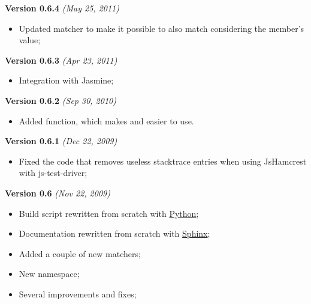 \documentclass[letterpaper,10pt,english]{sphinxmanual}
\begin{document}
\textbf{Version 0.6.4} \emph{(May 25, 2011)}
\begin{itemize}
\item {} 
Updated  matcher to make it possible to also match considering
the member's value;

\end{itemize}

\textbf{Version 0.6.3} \emph{(Apr 23, 2011)}
\begin{itemize}
\item {} 
Integration with Jasmine;

\end{itemize}

\textbf{Version 0.6.2} \emph{(Sep 30, 2010)}
\begin{itemize}
\item {} 
Added {\hyperref[modules/operator:JsHamcrest.Operators.callTo]{}} function, which makes
{\hyperref[modules/matchers:JsHamcrest.Matchers.raises]{}} and
{\hyperref[modules/matchers:JsHamcrest.Matchers.raisesAnything]{}} easier to use.

\end{itemize}

\textbf{Version 0.6.1} \emph{(Dec 22, 2009)}
\begin{itemize}
\item {} 
Fixed the code that removes useless stacktrace entries when using JsHamcrest
with js-test-driver;

\end{itemize}

\textbf{Version 0.6} \emph{(Nov 22, 2009)}
\begin{itemize}
\item {} 
Build script rewritten from scratch with \href{http://python.org/}{Python};

\item {} 
Documentation rewritten from scratch with \href{http://sphinx.pocoo.org/}{Sphinx};

\item {} 
Added a couple of new matchers;

\item {} 
New {\hyperref[modules/operator:module-JsHamcrest.Operators]{}} namespace;

\item {} 
Several improvements and fixes;

\end{itemize}
\end{document}
